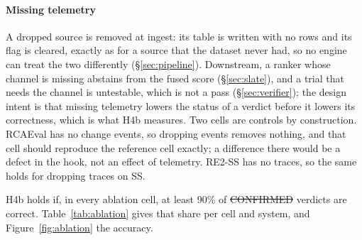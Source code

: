 \paragraph{Missing telemetry}
A dropped source is removed at ingest: its table is written with no rows and its flag is cleared, exactly as for a source that the dataset never had, so no engine can treat the two differently (\S\ref{sec:pipeline}).
Downstream, a ranker whose channel is missing abstains from the fused score (\S\ref{sec:slate}), and a trial that needs the channel is untestable, which is not a pass (\S\ref{sec:verifier}); the design intent is that missing telemetry lowers the status of a verdict before it lowers its correctness, which is what H4b measures.
Two cells are controls by construction.
RCAEval has no change events, so dropping events removes nothing, and that cell should reproduce the reference cell exactly; a difference there would be a defect in the hook, not an effect of telemetry.
RE2-SS has no traces, so the same holds for dropping traces on SS.

H4b holds if, in every ablation cell, at least 90\% of \st{CONFIRMED} verdicts are correct.
Table~\ref{tab:ablation} gives that share per cell and system, and Figure~\ref{fig:ablation} the accuracy.
